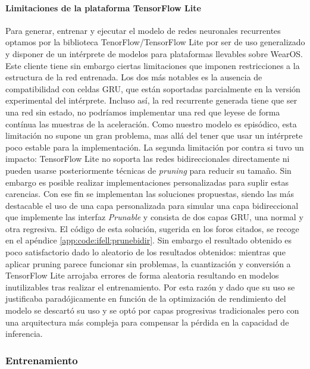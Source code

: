 \paragraph{Limitaciones de la plataforma TensorFlow Lite}\label{par:desc:modelo:rnn:limitaciones}
Para generar, entrenar y ejecutar el modelo de redes neuronales recurrentes optamos por la biblioteca TenorFlow/TensorFlow Lite por ser de uso generalizado y disponer de un intérprete de modelos para plataformas llevables sobre WearOS. Este cliente tiene sin embargo ciertas limitaciones que imponen restricciones a la estructura de la red entrenada. Los dos más notables es la ausencia de compatibilidad con celdas GRU\cite{tfliteGru}, que están soportadas parcialmente en la versión experimental del intérprete. Incluso así, la red recurrente generada tiene que ser una red sin estado, no podríamos implementar una red que leyese de forma contínua las muestras de la aceleración. Como nuestro modelo es episódico, esta limitación no supone un gran problema, mas allá del tener que usar un intérprete poco estable para la implementación. 
La segunda limitación por contra si tuvo un impacto: TensorFlow Lite no soporta las redes bidireccionales directamente\cite{tfliteBidir} ni pueden usarse posteriormente técnicas de \textit{pruning} para reducir su tamaño\cite{tfPruneBidir}. Sin embargo es posible realizar implementaciones personalizadas para suplir estas carencias. Con ese fin se implementan las soluciones propuestas, siendo las más destacable el uso de una capa personalizada para simular una capa bidireccional que implemente las interfaz \textit{Prunable} y consista de dos capas GRU, una normal y otra regresiva. El código de esta solución, sugerida en los foros citados, se recoge en el apéndice  \ref{app:code:ifell:prunebidir}. Sin embargo el resultado obtenido es poco satisfactorio dado lo aleatorio de los resultados obtenidos: mientras que aplicar pruning parece funcionar sin problemas, la cuantización y conversión a TensorFlow Lite arrojaba errores de forma aleatoria resultando en modelos inutilizables tras realizar el entrenamiento. Por esta razón y dado que su uso se justificaba paradójicamente en función de la optimización de rendimiento del modelo se descartó su uso y se optó por capas progresivas tradicionales pero con una arquitectura más compleja para compensar la pérdida en la capacidad de inferencia.

\subsubsection{Entrenamiento}


